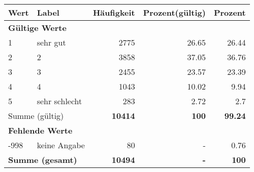      \begin{longtable}{lXrrr}
     \toprule
     \textbf{Wert} & \textbf{Label} & \textbf{Häufigkeit} & \textbf{Prozent(gültig)} & \textbf{Prozent} \\
     \endhead
     \midrule
     \multicolumn{5}{l}{\textbf{Gültige Werte}}\\

     1 &
     \multicolumn{1}{X}{ sehr gut   } &


       \num{2775} &
       \num[round-mode=places,round-precision=2]{26,65} &
         \num[round-mode=places,round-precision=2]{26,44} \\

     2 &
     \multicolumn{1}{X}{ 2   } &


       \num{3858} &
       \num[round-mode=places,round-precision=2]{37,05} &
         \num[round-mode=places,round-precision=2]{36,76} \\

     3 &
     \multicolumn{1}{X}{ 3   } &


       \num{2455} &
       \num[round-mode=places,round-precision=2]{23,57} &
         \num[round-mode=places,round-precision=2]{23,39} \\

     4 &
     \multicolumn{1}{X}{ 4   } &


       \num{1043} &
       \num[round-mode=places,round-precision=2]{10,02} &
         \num[round-mode=places,round-precision=2]{9,94} \\

     5 &
     \multicolumn{1}{X}{ sehr schlecht   } &


       \num{283} &
       \num[round-mode=places,round-precision=2]{2,72} &
         \num[round-mode=places,round-precision=2]{2,7} \\
     \midrule
     \multicolumn{2}{l}{Summe (gültig)} &
       \textbf{\num{10414}} &
     \textbf{100} &
       \textbf{\num[round-mode=places,round-precision=2]{99,24}} \\
     \multicolumn{5}{l}{\textbf{Fehlende Werte}}\\
       -998 &
       keine Angabe &
         \num{80} &
        - &
         \num[round-mode=places,round-precision=2]{0,76} \\
     \midrule
     \multicolumn{2}{l}{\textbf{Summe (gesamt)}} &
          \textbf{\num{10494}} &
        \textbf{-} &
        \textbf{100} \\
     \bottomrule
     \end{longtable}
     
